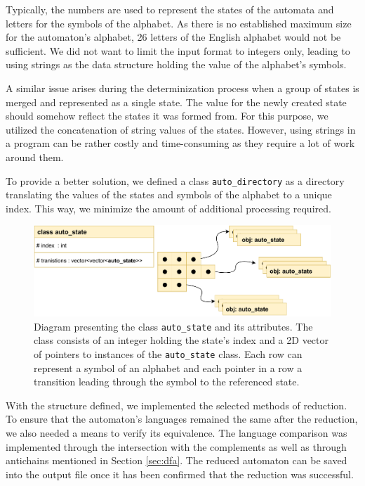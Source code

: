 Typically, the numbers are used to represent the states of the automata and letters for the symbols of the alphabet. As there is no established maximum size for the automaton's alphabet, 26 letters of the English alphabet would not be sufficient. We did not want to limit the input format to integers only, leading to using strings as the data structure holding the value of the alphabet's symbols.

A similar issue arises during the determinization process when a group of states is merged and represented as a single state. The value for the newly created state should somehow reflect the states it was formed from. For this purpose, we utilized the concatenation of string values of the states. However, using strings in a program can be rather costly and time-consuming as they require a lot of work around them.

To provide a better solution, we defined a class \verb|auto_directory| as a directory translating the values of the states and symbols of the alphabet to a unique index. This way, we minimize the amount of additional processing required. \\

\begin{figure}[!hb]
    \label{fig:state_diagram}
    \centering
    \includegraphics[width=0.9\linewidth]{obrazky-figures/state_class.pdf}
    \caption{Diagram presenting the class \texttt{auto\_state} and its attributes. The class consists of an integer holding the state's index and a 2D vector of pointers to instances of the \texttt{auto\_state} class. Each row can represent a symbol of an alphabet and each pointer in a row a transition leading through the symbol to the referenced state.}
\end{figure}
\vspace{0.3cm}

With the structure defined, we implemented the selected methods of reduction. To ensure that the automaton's languages remained the same after the reduction, we also needed a means to verify its equivalence. The language comparison was implemented through the intersection with the complements as well as through antichains mentioned in Section \ref{sec:dfa}. The reduced automaton can be saved into the output file once it has been confirmed that the reduction was successful.

